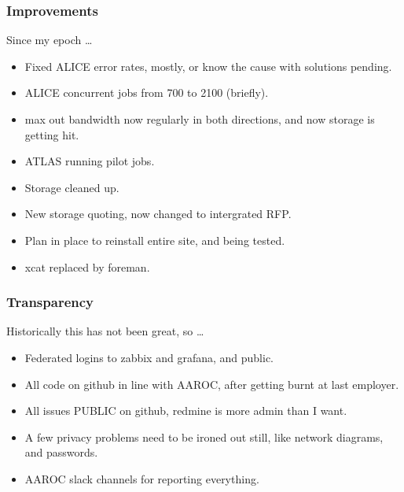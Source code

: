 \documentclass{beamer}
\begin{document}
\begin{frame}
  \frametitle{Improvements}
  Since my epoch \ldots
  \begin{itemize}
    \item Fixed ALICE error rates, mostly, or know the cause with solutions pending.
    \item ALICE concurrent jobs from 700 to 2100 (briefly).
    \item max out bandwidth now regularly in both directions, and now storage is getting hit.
    \item ATLAS running pilot jobs. 
    \item Storage cleaned up.
    \item New storage quoting, now changed to intergrated RFP.
    \item Plan in place to reinstall entire site, and being tested.
        \item xcat replaced by foreman.
  \end{itemize}

\end{frame}

\begin{frame}
  \frametitle{Transparency}
  Historically this has not been great, so \ldots
  \begin{itemize}
    \item Federated logins to zabbix and grafana, and public.
    \item All code on github in line with AAROC, after getting burnt at last employer.
    \item All issues PUBLIC on github, redmine is more admin than I want.
    \item A few privacy problems need to be ironed out still, like network diagrams, and passwords.
    \item AAROC slack channels for reporting everything.
  \end{itemize}
\end{frame}
\end{document}
